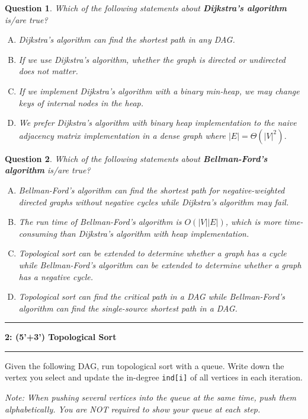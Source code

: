 \documentclass[10.5pt]{article}
\newcommand\question[2]{\vspace{.25in}\hrule\textbf{#1: #2}\vspace{.5em}\hrule\vspace{.10in}}
\newtheorem{Q}{Question}
\begin{document}
\begin{Q}
	Which of the following statements about \textbf{Dijkstra’s algorithm} is/are true?
	\begin{enumerate}[(A)]
		\item Dijkstra’s algorithm can find the shortest path in any DAG.
		\item If we use Dijkstra’s algorithm, whether the graph is directed or undirected does not matter.
		\item If we implement Dijkstra’s algorithm with a binary min-heap, we may change keys of internal nodes in the heap.
		\item We prefer Dijkstra’s algorithm with binary heap implementation to the naive adjacency matrix implementation in a dense graph where $|E| = \Theta(|V|^2)$.
	\end{enumerate}
\end{Q}
\vspace{0.5cm}

\begin{Q}
	Which of the following statements about \textbf{Bellman-Ford's algorithm} is/are true?
	\begin{enumerate}[(A)]
		\item Bellman-Ford's algorithm can find the shortest path for negative-weighted directed graphs without negative cycles while Dijkstra’s algorithm may fail.
		\item The run time of Bellman-Ford's algorithm is $O(|V||E|)$, which is more time-consuming than Dijkstra’s algorithm with heap implementation.
		\item Topological sort can be extended to determine whether a graph has a cycle while Bellman-Ford's algorithm can be extended to determine whether a graph has a negative cycle.
		\item Topological sort can find the critical path in a DAG while Bellman-Ford's algorithm can find the single-source shortest path in a DAG.
	\end{enumerate}
\end{Q}
\vspace{0.5cm}

\pagebreak

\question{2}{(5'+3') Topological Sort}


Given the following DAG, run topological sort with a queue. Write down the vertex you select and update the in-degree \texttt{ind[i]} of all vertices in each iteration.

\textit{Note: When pushing several vertices into the queue at the same time, push them alphabetically. You are NOT required to show your queue at each step.}
\end{document}
